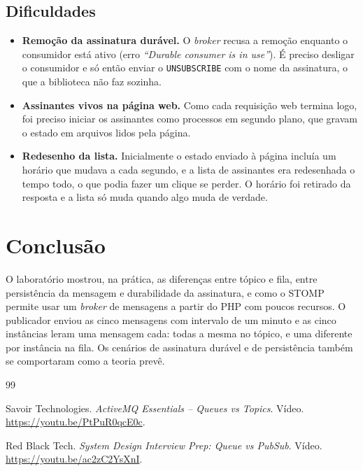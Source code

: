 \documentclass[11pt,a4paper]{article}
\begin{document}
\subsection{Dificuldades}
\begin{itemize}
  \item \textbf{Remo\c{c}\~ao da assinatura dur\'avel.} O \textit{broker} recusa a remo\c{c}\~ao
        enquanto o consumidor est\'a ativo (erro \emph{``Durable consumer is in use''}).
        \'E preciso desligar o consumidor e s\'o ent\~ao enviar o \texttt{UNSUBSCRIBE} com
        o nome da assinatura, o que a biblioteca n\~ao faz sozinha.
  \item \textbf{Assinantes vivos na p\'agina web.} Como cada requisi\c{c}\~ao web termina logo,
        foi preciso iniciar os assinantes como processos em segundo plano, que gravam o
        estado em arquivos lidos pela p\'agina.
  \item \textbf{Redesenho da lista.} Inicialmente o estado enviado \`a p\'agina inclu\'ia um
        hor\'ario que mudava a cada segundo, e a lista de assinantes era redesenhada
        o tempo todo, o que podia fazer um clique se perder. O hor\'ario foi retirado da
        resposta e a lista s\'o muda quando algo muda de verdade.
\end{itemize}

\section{Conclus\~ao}

O laborat\'orio mostrou, na pr\'atica, as diferen\c{c}as entre t\'opico e fila, entre
persist\^encia da mensagem e durabilidade da assinatura, e como o STOMP permite usar um
\textit{broker} de mensagens a partir do PHP com poucos recursos. O publicador enviou as
cinco mensagens com intervalo de um minuto e as cinco inst\^ancias leram uma mensagem
cada: todas a mesma no t\'opico, e uma diferente por inst\^ancia na fila. Os cen\'arios de
assinatura dur\'avel e de persist\^encia tamb\'em se comportaram como a teoria prev\^e.

\begin{thebibliography}{99}\small

 Savoir Technologies.
\newblock \emph{ActiveMQ Essentials -- Queues vs Topics}. V\'ideo.
\newblock \url{https://youtu.be/PtPuR0qcE0c}.

 Red Black Tech.
\newblock \emph{System Design Interview Prep: Queue vs PubSub}. V\'ideo.
\newblock \url{https://youtu.be/ac2zC2YsXnI}.

\end{thebibliography}
\end{document}

